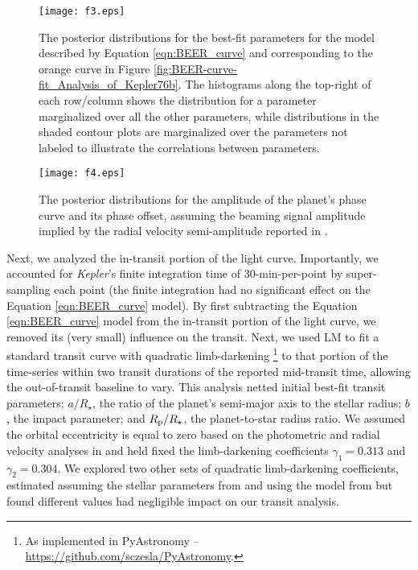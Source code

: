 \documentclass[manuscript]{aastex62}
\newcommand{\kepler}{{\it Kepler}}
\begin{document}
\begin{figure}
\texttt{[image: f3.eps]}
\caption{The posterior distributions for the best-fit parameters for the model described by Equation \ref{eqn:BEER_curve} and corresponding to the orange curve in Figure \ref{fig:BEER-curve-fit_Analysis_of_Kepler76b}. The histograms along the top-right of each row/column shows the distribution for a parameter marginalized over all the other parameters, while distributions in the shaded contour plots are marginalized over the parameters not labeled to illustrate the correlations between parameters. \label{fig:BEER-curve-fit-params_Analysis-of-Kepler76b}}
\end{figure}

\begin{figure}
\texttt{[image: f4.eps]}
\caption{The posterior distributions for the amplitude of the planet's phase curve and its phase offset, assuming the beaming signal amplitude implied by the radial velocity semi-amplitude reported in \citet{2013ApJ...771...26F}. \label{fig:Aplanet-delta-fit-params_Analysis-of-Kepler76b}}
\end{figure}

Next, we analyzed the in-transit portion of the light curve. Importantly, we accounted for \kepler's finite integration time of 30-min-per-point by super-sampling each point (the finite integration had no significant effect on the Equation \ref{eqn:BEER_curve} model). By first subtracting the Equation \ref{eqn:BEER_curve} model from the in-transit portion of the light curve, we removed its (very small) influence on the transit. Next, we used LM to fit a standard transit curve with quadratic limb-darkening \citep{2002ApJ...580L.171M}\footnote{As implemented in PyAstronomy -- \url{https://github.com/sczesla/PyAstronomy}.} to that portion of the time-series within two transit durations of the reported mid-transit time, allowing the out-of-transit baseline to vary. This analysis netted initial best-fit transit parameters: $a/R_\star$, the ratio of the planet's semi-major axis to the stellar radius; $b$, the impact parameter; and $R_{\rm p}/R_\star$, the planet-to-star radius ratio. We assumed the orbital eccentricity is equal to zero based on the photometric and radial velocity analyses in \citet{2013ApJ...771...26F} and held fixed the limb-darkening coefficients $\gamma_1 = 0.313$ and $\gamma_2 = 0.304$. We explored two other sets of quadratic limb-darkening coefficients, estimated assuming the stellar parameters from \citet{2013ApJ...771...26F} and using the model from \citet{2015MNRAS.450.1879E} but found different values had negligible impact on our transit analysis. 
\end{document}
